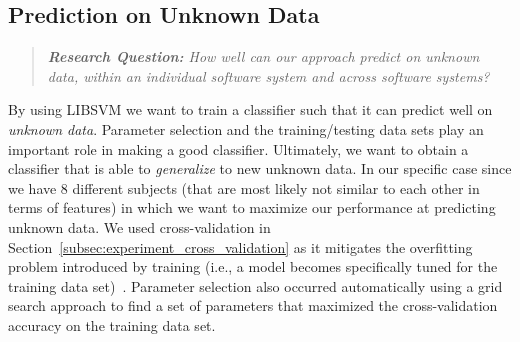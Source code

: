 \subsection{Prediction on Unknown Data}
\label{subsec:experiment_prediction}
\begin{quote}
	\emph{\textbf{Research Question:} How well can our approach predict on unknown data, within an individual software system and across software systems?}
\end{quote}

\noindent
By using LIBSVM we want to train a classifier such that it can predict well on \emph{unknown data}. Parameter selection and the training/testing data sets play an important role in making a good classifier. Ultimately, we want to obtain a classifier that is able to \emph{generalize} to new unknown data. In our specific case since we have 8 different subjects (that are most likely not similar to each other in terms of features) in which we want to maximize our performance at predicting unknown data. We used cross-validation in Section~\ref{subsec:experiment_cross_validation} as it mitigates the overfitting problem introduced by training (i.e., a model becomes specifically tuned for the training data set)~\cite{HCL03}. Parameter selection also occurred automatically using a grid search approach to find a set of parameters that maximized the cross-validation accuracy on the training data set.

